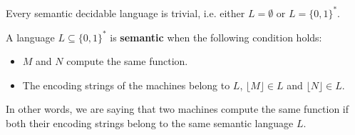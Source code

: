 \begin{definition}[title = Theorem]
    Every semantic decidable language is trivial, i.e. either $L = \emptyset$ or $L = \{0,1\}^*$.
\end{definition}
A language $L \subseteq \{0,1\}^*$ is \textbf{semantic} when the following condition holds: 
\begin{itemize}
    \renewcommand{\labelitemi}{-}
    \item $M$ and $N$ compute the same function.
    \item The encoding strings of the machines belong to $L$, $\lfloor M \rfloor \in L$ and $\lfloor N \rfloor \in L$.
\end{itemize}
In other words, we are saying that two machines compute the same function if both their encoding strings 
belong to the same semantic language $L$.
